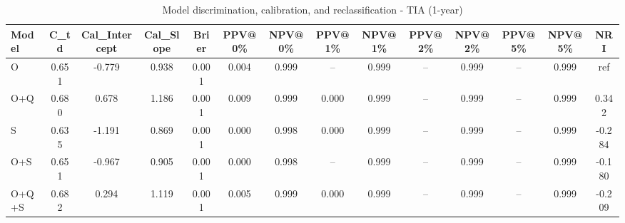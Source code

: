 \begin{table}[htbp]
\centering
\small
\caption{Model discrimination, calibration, and reclassification - TIA (1-year)}
\label{tab:perf_tia_1y}
\begin{tabular}{lccccccccccccc}
\toprule
Model & C\_td & Cal\_Intercept & Cal\_Slope & Brier & PPV@0\% & NPV@0\% & PPV@1\% & NPV@1\% & PPV@2\% & NPV@2\% & PPV@5\% & NPV@5\% & NRI \\
\midrule
O & 0.651 & -0.779 & 0.938 & 0.001 & 0.004 & 0.999 & -- & 0.999 & -- & 0.999 & -- & 0.999 & ref \\
O+Q & 0.680 & 0.678 & 1.186 & 0.001 & 0.009 & 0.999 & 0.000 & 0.999 & -- & 0.999 & -- & 0.999 & 0.342 \\
S & 0.635 & -1.191 & 0.869 & 0.001 & 0.000 & 0.998 & 0.000 & 0.999 & -- & 0.999 & -- & 0.999 & -0.284 \\
O+S & 0.651 & -0.967 & 0.905 & 0.001 & 0.000 & 0.998 & -- & 0.999 & -- & 0.999 & -- & 0.999 & -0.180 \\
O+Q+S & 0.682 & 0.294 & 1.119 & 0.001 & 0.005 & 0.999 & 0.000 & 0.999 & -- & 0.999 & -- & 0.999 & -0.209 \\
\bottomrule
\end{tabular}
\end{table}